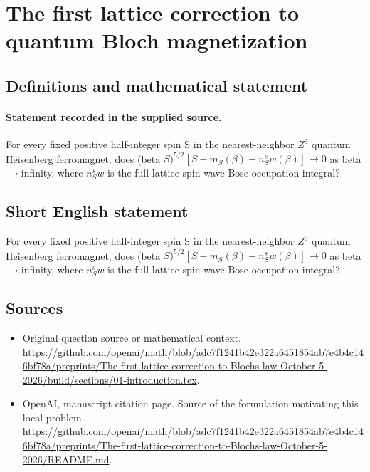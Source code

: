 \documentclass[11pt]{article}
\begin{document}
\section*{The first lattice correction to quantum Bloch magnetization}\label{30007212}
\subsection{Definitions and mathematical statement}
\paragraph{Statement recorded in the supplied source.}
For every fixed positive half-integer spin S in the nearest-neighbor $Z^3$ quantum Heisenberg ferromagnet, does (beta $S)^{5/2}[S-m_S(\beta )-n_S^sw(\beta )]\to 0$ as beta$\to$infinity, where $n_S^sw$ is the full lattice spin-wave Bose occupation integral?
\subsection{Short English statement}
For every fixed positive half-integer spin S in the nearest-neighbor $Z^3$ quantum Heisenberg ferromagnet, does (beta $S)^{5/2}[S-m_S(\beta )-n_S^sw(\beta )]\to 0$ as beta$\to$infinity, where $n_S^sw$ is the full lattice spin-wave Bose occupation integral?
\subsection{Sources}
\begin{itemize}
\item[S1] Original question source or mathematical context.
\url{https://github.com/openai/math/blob/adc7f1241b42e322a6451854ab7e4b4c146bf78a/preprints/The-first-lattice-correction-to-Blochs-law-October-5-2026/build/sections/01-introduction.tex}.
\item[S2] OpenAI, manuscript citation page. Source of the formulation motivating this local problem.
\url{https://github.com/openai/math/blob/adc7f1241b42e322a6451854ab7e4b4c146bf78a/preprints/The-first-lattice-correction-to-Blochs-law-October-5-2026/README.md}.
\end{itemize}
\end{document}
